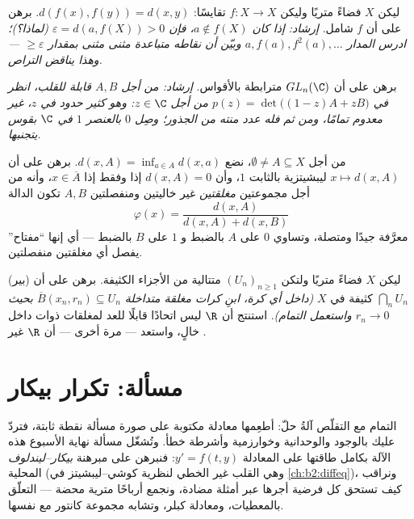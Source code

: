 \begin{exercise}[$\star\star\star$]\label{exo:b2:metric:9}
ليكن $X$ فضاءً متريًا \emph{} وليكن $f \colon X \to X$
تقايسًا: $d(f(x), f(y)) = d(x, y)$. برهن على أن $f$ شامل.
\emph{إرشاد: إذا كان $a \notin f(X)$، فإن $\varepsilon = d(a, f(X)) > 0$
(لماذا؟)؛ ادرس المدار $a, f(a), f^2(a), \dots$ وبيّن أن
نقاطه متباعدة مثنى مثنى بمقدار $\geq \varepsilon$ --- وهذا يناقض
التراص.}
\end{exercise}

\begin{exercise}[$\star\star\star$]\label{exo:b2:metric:10}
برهن على أن $GL_n(\C)$ مترابطة بالأقواس. \emph{إرشاد: من أجل $A, B$
قابلة للقلب، انظر في $p(z) = \det\bigl((1 - z)A + zB\bigr)$ من أجل $z
\in \C$: وهو كثير حدود في $z$، غير معدوم تمامًا، ومن ثم فله
عدد منته من الجذور؛ وصِل $0$ بالعنصر $1$ في $\C$ بقوس يتجنبها.}
\end{exercise}

\begin{exercise}[$\star\star$]\label{exo:b2:metric:11}
من أجل $\emptyset \neq A \subseteq X$، نضع $d(x, A) = \inf_{a \in A}
d(x, a)$. برهن على أن $x \mapsto d(x, A)$ ليبشيتزية بالثابت $1$، وأن
$d(x, A) = 0$ إذا وفقط إذا $x \in \overline A$، وأنه من أجل مجموعتين
\emph{مغلقتين} غير خاليتين ومنفصلتين $A, B$ تكون الدالة
\[
\varphi(x) = \frac{d(x, A)}{d(x, A) + d(x, B)}
\]
معرَّفة جيدًا ومتصلة، وتساوي $0$ على $A$ بالضبط و
$1$ على $B$ بالضبط --- أي إنها ``مفتاح''  يفصل أي مغلقتين
منفصلتين.
\end{exercise}

\begin{exercise}[$\star\star\star$]\label{exo:b2:metric:12}
(بير) ليكن $X$ فضاءً متريًا  ولتكن $(U_n)_{n\geq1}$
متتالية من الأجزاء  الكثيفة. برهن على أن $\bigcap_n U_n$
كثيفة في $X$ \emph{(داخل أي كرة، ابنِ كرات مغلقة متداخلة
$\overline B(x_n, r_n) \subseteq U_n$ بحيث $r_n \to 0$ واستعمل
التمام)}. استنتج أن $\R$ ليس اتحادًا قابلًا للعد
لمغلقات ذوات داخل خالٍ، واستعد --- مرة أخرى --- أن
$\R$ غير .
\end{exercise}

\section{مسألة: تكرار بيكار}

التمام مع التقلّص آلةُ حلّ: أطعِمها معادلة مكتوبة
على صورة مسألة نقطة ثابتة، فتردّ عليك
بالوجود والوحدانية وخوارزمية وأشرطة خطأ. وتُشغّل مسألة نهاية
الأسبوع هذه الآلة بكامل طاقتها على المعادلة $y' = f(t,
y)$: فنبرهن على مبرهنة \emph{بيكار--ليندلوف} المحلية (وهي
القلب غير الخطي لنظرية كوشي--ليبشيتز في \cref{ch:b2:diffeq})،
ونراقب كيف تستحق كل فرضية أجرها عبر
أمثلة مضادة، ونجمع أرباحًا مترية محضة ---
التعلّق  بالمعطيات، ومعادلة كبلر،
وتشابه مجموعة كانتور مع نفسها.

